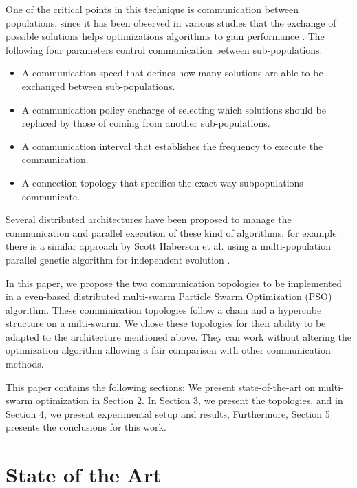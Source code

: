 \documentclass[runningheads]{llncs}
\begin{document}
One of the critical points in this technique is communication between
populations, since it has been observed in various studies that the
exchange of possible solutions helps optimizations algorithms to gain performance \cite{a2}. The following four parameters
control communication between sub-populations:

\begin{itemize}
    \item A communication speed that defines how many solutions are able to be exchanged between sub-populations.
    \item A communication policy encharge of selecting which solutions should be replaced by those of coming from another sub-populations.
    \item A communication interval that establishes the frequency to execute the communication.
    \item A connection topology that specifies the exact way subpopulations communicate.
\end{itemize}

Several distributed architectures have been proposed to manage the communication
and parallel execution of these kind of algorithms, for example there is a
similar approach by Scott Haberson et al. using a multi-population parallel
genetic algorithm for independent evolution \cite{da1}. 

In this paper, we propose the two communication topologies to be implemented in a 
even-based distributed multi-swarm Particle Swarm Optimization (PSO) algorithm.
These comminication topologies follow a chain and a hypercube structure on a milti-swarm. We chose
these topologies for their ability to be adapted to the architecture
mentioned above. They can work without altering the optimization
algorithm allowing a fair comparison with other communication
methods. 

This paper contains the following sections: We present state-of-the-art on
multi-swarm optimization in Section 2. In Section 3, we present the topologies,
and in Section 4, we present experimental setup and results, Furthermore,
Section 5 presents the conclusions for this work.

\section{State of the Art}
\end{document}
